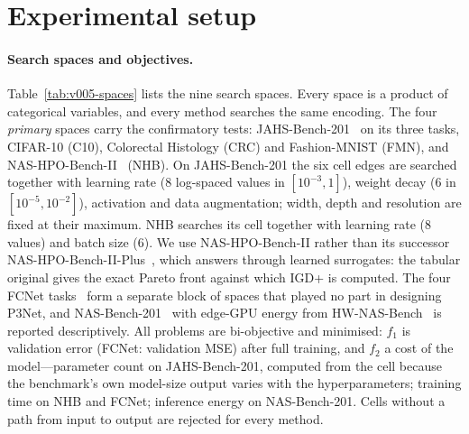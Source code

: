 
\section{Experimental setup}
\label{sec:setup}

\paragraph{Search spaces and objectives.} Table~\ref{tab:v005-spaces} lists the nine search spaces. Every space is a
product of categorical variables, and every method searches the same encoding. The four \emph{primary} spaces carry
the confirmatory tests: JAHS-Bench-201~\citep{bansal2022jahsbench} on its three tasks, CIFAR-10 (C10), Colorectal
Histology (CRC) and Fashion-MNIST (FMN), and NAS-HPO-Bench-II~\citep{hirose2021nashpobenchii} (NHB). On JAHS-Bench-201
the six cell edges are searched together with learning rate (8 log-spaced values in $[10^{-3}, 1]$), weight decay
(6 in $[10^{-5}, 10^{-2}]$), activation and data augmentation; width, depth and resolution are fixed at their
maximum. NHB searches its cell together with learning rate (8 values) and batch size (6). We use NAS-HPO-Bench-II
rather than its successor NAS-HPO-Bench-II-Plus~\citep{hirose2026nashpobenchiiplus}, which answers through learned
surrogates: the tabular original gives the exact Pareto front against which IGD+ is computed. The four FCNet
tasks~\citep{klein2019tabular} form a separate block of spaces that played no part in designing P3Net, and
NAS-Bench-201~\citep{dong2020nasbench201} with edge-GPU energy from HW-NAS-Bench~\citep{li2021hwnasbench} is reported
descriptively. All problems are bi-objective and minimised: $f_1$ is validation error (FCNet: validation MSE) after
full training, and $f_2$ a cost of the model---parameter count on JAHS-Bench-201, computed from the cell because the
benchmark's own model-size output varies with the hyperparameters; training time on NHB and FCNet; inference energy on
NAS-Bench-201. Cells without a path from input to output are rejected for every method.

